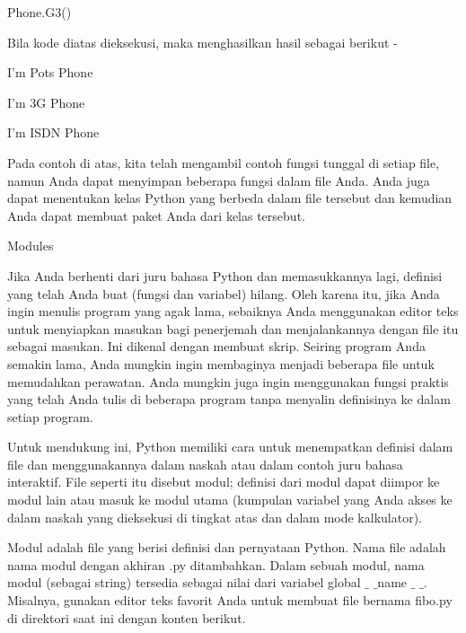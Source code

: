 \noindent 
 \hspace*{0.5in} Phone.G3() \par
\noindent 
Bila kode diatas dieksekusi, maka menghasilkan hasil sebagai berikut - \par
\noindent 
 \hspace*{0.5in} I'm Pots Phone \par
\noindent 
 \hspace*{0.5in} I'm 3G Phone \par
\noindent 
 \hspace*{0.5in} I'm ISDN Phone \par
\noindent 
Pada contoh di atas, kita telah mengambil contoh fungsi tunggal di setiap file, namun Anda dapat menyimpan beberapa fungsi dalam file Anda. Anda juga dapat menentukan kelas Python yang berbeda dalam file tersebut dan kemudian Anda dapat membuat paket Anda dari kelas tersebut. \par
\vspace{12pt}
\noindent 
Modules \par
\noindent 
Jika Anda berhenti dari juru bahasa Python dan memasukkannya lagi, definisi yang telah Anda buat (fungsi dan variabel) hilang. Oleh karena itu, jika Anda ingin menulis program yang agak lama, sebaiknya Anda menggunakan editor teks untuk menyiapkan masukan bagi penerjemah dan menjalankannya dengan file itu sebagai masukan. Ini dikenal dengan membuat skrip. Seiring program Anda semakin lama, Anda mungkin ingin membaginya menjadi beberapa file untuk memudahkan perawatan. Anda mungkin juga ingin menggunakan fungsi praktis yang telah Anda tulis di beberapa program tanpa menyalin definisinya ke dalam setiap program. \par
\noindent 
Untuk mendukung ini, Python memiliki cara untuk menempatkan definisi dalam file dan menggunakannya dalam naskah atau dalam contoh juru bahasa interaktif. File seperti itu disebut modul; definisi dari modul dapat diimpor ke modul lain atau masuk ke modul utama (kumpulan variabel yang Anda akses ke dalam naskah yang dieksekusi di tingkat atas dan dalam mode kalkulator). \par
\noindent 
Modul adalah file yang berisi definisi dan pernyataan Python. Nama file adalah nama modul dengan akhiran .py ditambahkan. Dalam sebuah modul, nama modul (sebagai string) tersedia sebagai nilai dari variabel global  $  \_  $ $  \_  $name $  \_  $ $  \_  $. Misalnya, gunakan editor teks favorit Anda untuk membuat file bernama fibo.py di direktori saat ini dengan konten berikut. \par
